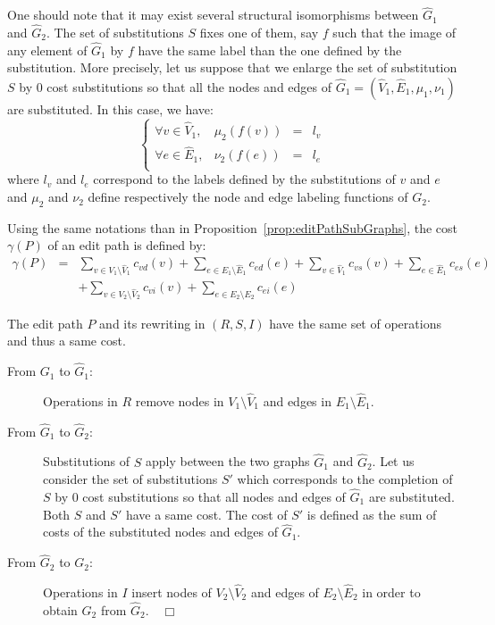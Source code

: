 One should note that it may exist several structural isomorphisms
between $\hat{G}_1$ and $\hat{G}_2$. The set of substitutions $S$
fixes one of them, say $f$ such that the image of any element of
$\hat{G}_1$ by $f$ have the same label than the one defined by the
substitution. More precisely, let us suppose that we enlarge the set
of substitution $S$ by $0$ cost substitutions so that all the
nodes and edges of $\hat{G}_1=(\hat{V}_1,\hat{E}_1,\mu_1,\nu_1)$
are substituted. In this case, we have:
\[
\left\{  \begin{array}{llll}
    \forall v\in \hat{V}_1, &\mu_2(f(v))&=&l_v\\
    \forall e\in \hat{E}_1, &\nu_2(f(e))&=&l_e\\
  \end{array}\right.
\]
where $l_v$ and $l_e$ correspond to the labels defined by the
substitutions of $v$ and $e$ and $\mu_2$ and $\nu_2$ define
respectively the node and edge labeling functions of $G_2$.
\begin{corollary}\label{coro:costEditPath}
  Using the same notations than in
  Proposition~\ref{prop:editPathSubGraphs}, the cost $\gamma(P)$ of an
  edit path is defined by:
  \renewcommand{\arraystretch}{2}
  \begin{equation*}
    \begin{array}{lcl}
      \gamma(P) & = & \displaystyle   \sum_{v\in V_1\setminus\hat{V}_1} c_{vd}(v)+
      \sum_{e\in E_1\setminus\hat{E}_1} c_{ed}(e)+
      \sum_{v\in \hat{V}_1} c_{vs}(v)+
      \sum_{e\in \hat{E}_1} c_{es}(e) \\
      & & \displaystyle + \sum_{v\in V_2\setminus\hat{V}_2} c_{vi}(v) + \sum_{e\in E_2\setminus\hat{E}_2} c_{ei}(e)
    \end{array}
  \end{equation*} 
\end{corollary}
  The edit path $P$ and its rewriting in $(R,S,I)$ have the same set of
  operations and thus a same cost.
  \begin{description}
  \item[From $G_1$ to $\hat{G}_1$:] Operations in $R$ remove
    nodes in $V_1\setminus\hat{V}_1$ and edges in $E_1\setminus\hat{E}_1$.
  \item[From $\hat{G}_1$ to $\hat{G}_2$:] Substitutions of $S$ apply
    between the two graphs $\hat{G}_1$ and $\hat{G}_2$. Let us
    consider the set of substitutions $S'$ which corresponds to the
    completion of $S$ by $0$ cost substitutions so that all nodes
    and edges of $\hat{G}_1$ are substituted. Both $S$ and $S'$ have
    a same cost. The cost of $S'$ is defined as the sum of costs of
    the substituted nodes and edges of $\hat{G}_1$.
  \item[From $\hat{G}_2$ to $G_2$:] Operations in $I$ insert
    nodes of $V_2\setminus\hat{V}_2$ and edges of $E_2\setminus\hat{E}_2$ in
    order to obtain $G_2$ from $\hat{G}_2$.~~{$\Box$}
  \end{description}

